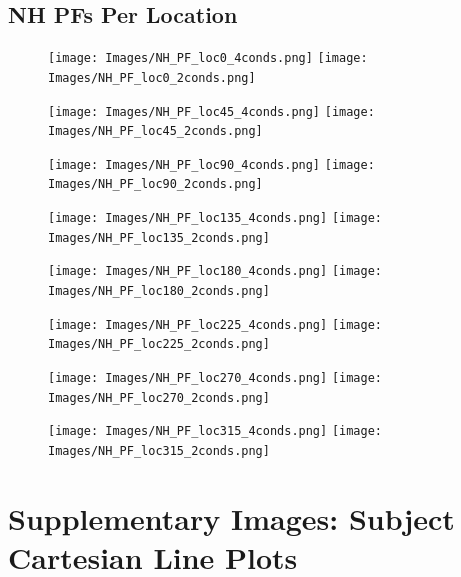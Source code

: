 \documentclass[11pt]{article} %
\begin{document}
\subsection{NH PFs Per Location}
\begin{figure}[H]
\centering %
\texttt{[image: Images/NH\_PF\_loc0\_4conds.png]}
\texttt{[image: Images/NH\_PF\_loc0\_2conds.png]}
\end{figure}
\begin{figure}[H]
\centering %
\texttt{[image: Images/NH\_PF\_loc45\_4conds.png]}
\texttt{[image: Images/NH\_PF\_loc45\_2conds.png]}
\end{figure}
\begin{figure}[H]
\centering %
\texttt{[image: Images/NH\_PF\_loc90\_4conds.png]}
\texttt{[image: Images/NH\_PF\_loc90\_2conds.png]}
\end{figure}
\begin{figure}[H]
\centering %
\texttt{[image: Images/NH\_PF\_loc135\_4conds.png]}
\texttt{[image: Images/NH\_PF\_loc135\_2conds.png]}
\end{figure}
\begin{figure}[H]
\centering %
\texttt{[image: Images/NH\_PF\_loc180\_4conds.png]}
\texttt{[image: Images/NH\_PF\_loc180\_2conds.png]}
\end{figure}
\begin{figure}[H]
\centering %
\texttt{[image: Images/NH\_PF\_loc225\_4conds.png]}
\texttt{[image: Images/NH\_PF\_loc225\_2conds.png]}
\end{figure}
\begin{figure}[H]
\centering %
\texttt{[image: Images/NH\_PF\_loc270\_4conds.png]}
\texttt{[image: Images/NH\_PF\_loc270\_2conds.png]}
\end{figure}
\begin{figure}[H]
\centering %
\texttt{[image: Images/NH\_PF\_loc315\_4conds.png]}
\texttt{[image: Images/NH\_PF\_loc315\_2conds.png]}
\end{figure}

\newpage
\section{Supplementary Images: Subject Cartesian Line Plots} 
\end{document}
